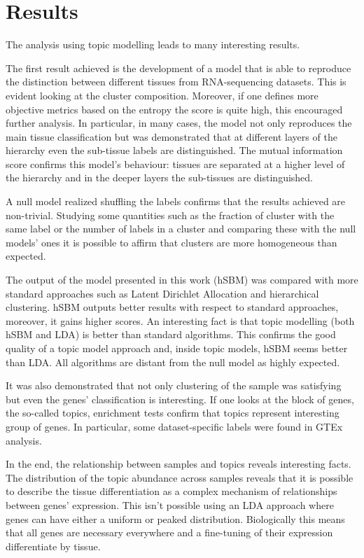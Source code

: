 \section{Results}\label{sec:topic/results}
The analysis using topic modelling leads to many interesting results.

The first result achieved is the development of a model that is able to reproduce the distinction between different tissues from RNA-sequencing datasets. This is evident looking at the cluster composition. Moreover, if one defines more objective metrics based on the entropy the score is quite high, this encouraged further analysis. In particular, in many cases, the model not only reproduces the main tissue classification but was demonstrated that at different layers of the hierarchy even the sub-tissue labels are distinguished. The mutual information score confirms this model's behaviour: tissues are separated at a higher level of the hierarchy and in the deeper layers the sub-tissues are distinguished.

A null model realized shuffling the labels confirms that the results achieved are non-trivial. Studying some quantities such as the fraction of cluster with the same label or the number of labels in a cluster and comparing these with the null models' ones it is possible to affirm that clusters are more homogeneous than expected.

The output of the model presented in this work (hSBM) was compared with more standard approaches such as Latent Dirichlet Allocation and hierarchical clustering. hSBM outputs better results with respect to standard approaches, moreover, it gains higher scores. An interesting fact is that topic modelling (both hSBM and LDA) is better than standard algorithms. This confirms the good quality of a topic model approach and, inside topic models, hSBM seems better than LDA. All algorithms are distant from the null model as highly expected.

It was also demonstrated that not only clustering of the sample was satisfying but even the genes' classification is interesting. If one looks at the block of genes, the so-called topics, enrichment tests confirm that topics represent interesting group of genes. In particular, some dataset-specific labels were found in GTEx analysis.

In the end, the relationship between samples and topics reveals interesting facts. The distribution of the topic abundance across samples reveals that it is possible to describe the tissue differentiation as a complex mechanism of relationships between genes' expression. This isn't possible using an LDA approach where genes can have either a uniform or peaked distribution. Biologically this means that all genes are necessary everywhere and a fine-tuning of their expression differentiate by tissue.

